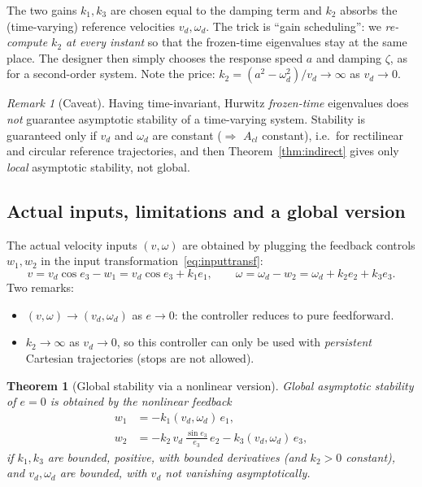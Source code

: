 \documentclass[11pt,a4paper]{article}
\def\bm#1{#1}%
\def\vect#1{#1}%
\newcommand{\vect}[1]{\bm{#1}}
\newcommand{\vd}{v_d}
\newcommand{\omd}{\omega_d}
\newcommand{\Acl}{\vect{A}_{cl}}
\theoremstyle{definition}
\theoremstyle{plain}
\newtheorem{theorem}[definition]{Theorem}
\theoremstyle{remark}
\newtheorem*{remark}{Remark}
\begin{document}
\begin{intuition}
The two gains $k_1,k_3$ are chosen equal to the damping term and $k_2$ absorbs the (time-varying) reference velocities $\vd,\omd$. The trick is ``gain scheduling'': we \emph{re-compute $k_2$ at every instant} so that the frozen-time eigenvalues stay at the same place. The designer then simply chooses the response speed $a$ and damping $\zeta$, as for a second-order system. Note the price: $k_2=(a^2-\omd^2)/\vd\to\infty$ as $\vd\to0$.
\end{intuition}

\begin{remark}[Caveat]
Having time-invariant, Hurwitz \emph{frozen-time} eigenvalues does \emph{not} guarantee asymptotic stability of a time-varying system. Stability is guaranteed only if $\vd$ and $\omd$ are constant ($\Rightarrow$ $\Acl$ constant), i.e.\ for rectilinear and circular reference trajectories, and then Theorem~\ref{thm:indirect} gives only \emph{local} asymptotic stability, not global.
\end{remark}

\subsection{Actual inputs, limitations and a global version}

The actual velocity inputs $(v,\omega)$ are obtained by plugging the feedback controls $w_1,w_2$ in the input transformation~\eqref{eq:inputtransf}:
\begin{equation}\label{eq:actualinputs}
v=\vd\cos e_3-w_1=\vd\cos e_3+k_1e_1,\qquad
\omega=\omd-w_2=\omd+k_2e_2+k_3e_3 .
\end{equation}
Two remarks:
\begin{itemize}[nosep]
\item $(v,\omega)\to(\vd,\omd)$ as $\vect e\to\vect 0$: the controller reduces to pure feedforward.
\item $k_2\to\infty$ as $\vd\to0$, so this controller can only be used with \emph{persistent} Cartesian trajectories (stops are not allowed).
\end{itemize}

\begin{theorem}[Global stability via a nonlinear version]\label{thm:nonlin}
Global asymptotic stability of $\vect e=\vect 0$ is obtained by the nonlinear feedback
\begin{align}
w_1&=-k_1(\vd,\omd)\,e_1,\\
w_2&=-k_2\,\vd\,\frac{\sin e_3}{e_3}\,e_2-k_3(\vd,\omd)\,e_3,
\end{align}
if $k_1,k_3$ are bounded, positive, with bounded derivatives (and $k_2>0$ constant), and $\vd,\omd$ are bounded, with $\vd$ not vanishing asymptotically.
\end{theorem}
\end{document}
